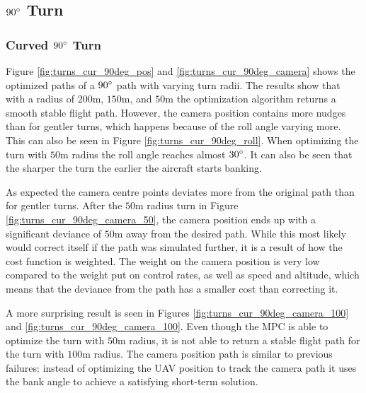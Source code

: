 \subsection{$90\degree$ Turn}

\subsubsection{Curved $90\degree$ Turn}

Figure \ref{fig:turns_cur_90deg_pos} and \ref{fig:turns_cur_90deg_camera} shows the optimized paths of a $90\degree$ path with varying turn radii. The results show that with a radius of $200$m, $150$m, and $50$m the optimization algorithm returns a smooth stable flight path. However, the camera position contains more nudges than for gentler turns, which happens because of the roll angle varying more. This can also be seen in Figure \ref{fig:turns_cur_90deg_roll}. When optimizing the turn with $50$m radius the roll angle reaches almost $30\degree$. It can also be seen that the sharper the turn the earlier the aircraft starts banking.

As expected the camera centre points deviates more from the original path than for gentler turns. After the $50$m radius turn in Figure \ref{fig:turns_cur_90deg_camera_50}, the camera position ends up with a significant deviance of $50$m away from the desired path. While this most likely would correct itself if the path was simulated further, it is a result of how the cost function is weighted. The weight on the camera position is very low compared to the weight put on control rates, as well as speed and altitude, which means that the deviance from the path has a smaller cost than correcting it.

A more surprising result is seen in Figures \ref{fig:turns_cur_90deg_camera_100} and \ref{fig:turns_cur_90deg_camera_100}. Even though the MPC is able to optimize the turn with $50$m radius, it is not able to return a stable flight path for the turn with $100$m radius. The camera position path is similar to previous failures: instead of optimizing the UAV position to track the camera path it uses the bank angle to achieve a satisfying short-term solution.

